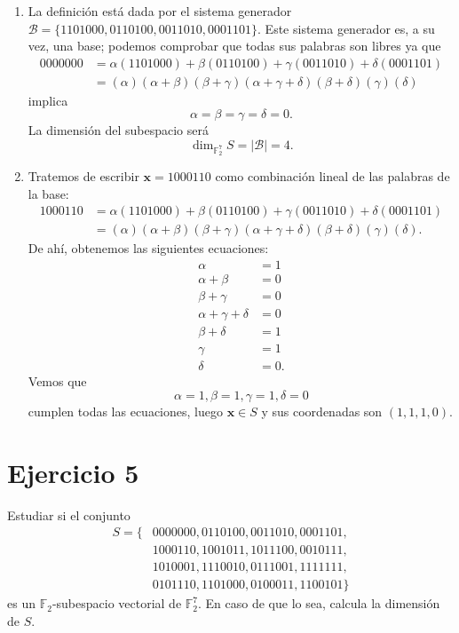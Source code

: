 \begin{enumerate}[label=\alph*)]
	\item La definición está dada por el sistema generador $\mathcal{B} = \{1101000, 0110100, 0011010, 0001101\}$. Este sistema generador es, a su vez, una base; podemos comprobar que todas sus palabras son libres ya que
	\begin{align*}
		0000000 &= \alpha(1101000) + \beta(0110100) + \gamma(0011010) + \delta(0001101)\\
		&= (\alpha)(\alpha+\beta)(\beta+\gamma)(\alpha+\gamma+\delta)(\beta+\delta)(\gamma)(\delta)
	\end{align*}
	implica
	\[\alpha=\beta=\gamma=\delta=0.\]
	La dimensión del subespacio será
	\[\dim_{\mathbb{F}_2^7}S = |\mathcal{B}| = 4.\]
	
	\item Tratemos de escribir $\textbf{x} = 1000110$ como combinación lineal de las palabras de la base:
	\begin{align*}
		1000110 &= \alpha(1101000) + \beta(0110100) + \gamma(0011010) + \delta(0001101)\\
		&= (\alpha)(\alpha+\beta)(\beta+\gamma)(\alpha+\gamma+\delta)(\beta+\delta)(\gamma)(\delta).
	\end{align*}
	De ahí, obtenemos las siguientes ecuaciones:
	\begin{align*}
		\alpha &= 1\\
		\alpha+\beta &= 0\\
		\beta+\gamma &= 0\\
		\alpha+\gamma+\delta &= 0\\
		\beta+\delta &= 1\\
		\gamma &= 1\\
		\delta &= 0.
	\end{align*}
	Vemos que
	\[\alpha=1, \beta=1, \gamma=1, \delta=0\]
	cumplen todas las ecuaciones, luego $\textbf{x}\in S$ y sus coordenadas son $(1,1,1,0)$.
\end{enumerate}

\section{Ejercicio 5}

\begin{formulationBox}
	Estudiar si el conjunto
	\begin{align*}
		S = \{&0000000, 0110100, 0011010, 0001101,\\
		&1000110, 1001011, 1011100, 0010111,\\
		&1010001, 1110010, 0111001, 1111111,\\
		&0101110, 1101000, 0100011, 1100101\}
	\end{align*}
	es un $\mathbb{F}_2$-subespacio vectorial de $\mathbb{F}_2^7$. En caso de que lo sea, calcula la dimensión de $S$.
\end{formulationBox}

